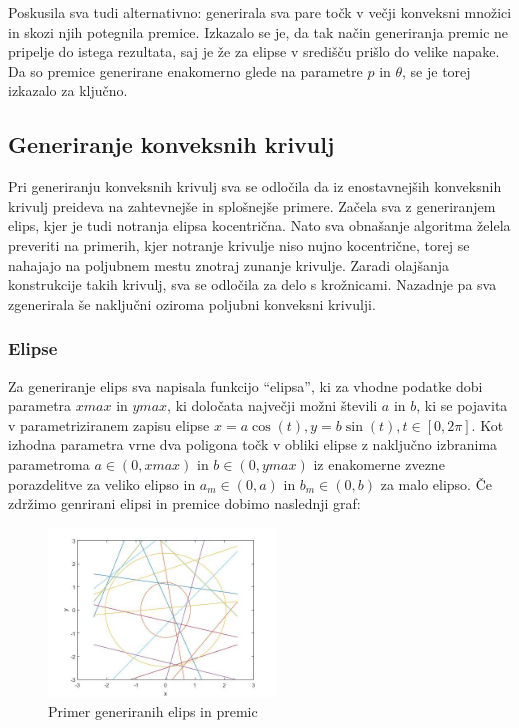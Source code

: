 \documentclass[a4paper]{article}
\begin{document}
Poskusila sva tudi alternativno: generirala sva pare točk v večji konveksni množici in skozi njih potegnila premice. Izkazalo se je, da tak način generiranja premic ne pripelje do istega rezultata, saj je že za elipse v središču prišlo do velike napake. Da so premice generirane enakomerno glede na parametre $p$ in $\theta$, se je torej izkazalo za ključno.

\subsection{Generiranje konveksnih krivulj}
Pri generiranju konveksnih krivulj sva se odločila da iz enostavnejših konveksnih krivulj preideva na zahtevnejše in splošnejše primere. Začela sva z generiranjem elips, kjer je tudi notranja elipsa kocentrična. Nato sva obnašanje algoritma želela preveriti na primerih, kjer notranje krivulje niso nujno kocentrične, torej se nahajajo na poljubnem mestu znotraj zunanje krivulje. Zaradi olajšanja konstrukcije takih krivulj, sva se odločila za delo s krožnicami. Nazadnje pa sva zgenerirala še naključni oziroma poljubni konveksni krivulji. 

\subsubsection{Elipse}
Za generiranje elips sva napisala funkcijo ``elipsa'', ki za vhodne podatke dobi parametra $xmax$ in $ymax$, ki določata največji možni števili $a$ in $b$, ki se pojavita v parametriziranem zapisu elipse $x=a \cos(t), y=b \sin(t), t\in [0, 2\pi]$. Kot izhodna parametra vrne dva poligona točk v obliki elipse z naključno izbranima parametroma $a \in (0, xmax)$ in $b \in (0, ymax)$ iz enakomerne zvezne porazdelitve za veliko elipso in $a_m \in (0, a)$ in $b_m \in (0, b)$ za malo elipso. Če zdržimo genrirani elipsi in premice dobimo naslednji graf:

\begin{figure}[h]
\centering
\includegraphics[width=60mm]{graf_primer.jpg}
\caption{Primer generiranih elips in premic \label{overflow}}
\end{figure} 
\end{document}
